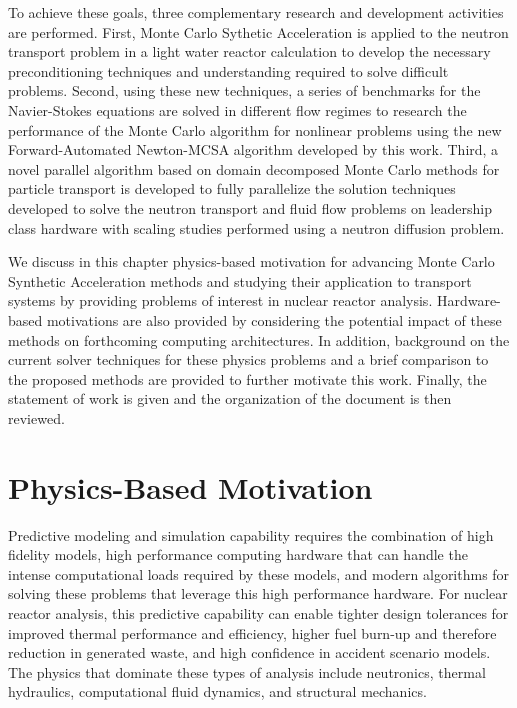 To achieve these goals, three complementary research and development
activities are performed. First, Monte Carlo Sythetic Acceleration is
applied to the neutron transport problem in a light water reactor
calculation to develop the necessary preconditioning techniques and
understanding required to solve difficult problems. Second, using
these new techniques, a series of benchmarks for the Navier-Stokes
equations are solved in different flow regimes to research the
performance of the Monte Carlo algorithm for nonlinear problems using
the new Forward-Automated Newton-MCSA algorithm developed by this
work. Third, a novel parallel algorithm based on domain decomposed
Monte Carlo methods for particle transport is developed to fully
parallelize the solution techniques developed to solve the neutron
transport and fluid flow problems on leadership class hardware with
scaling studies performed using a neutron diffusion problem.

We discuss in this chapter physics-based motivation for advancing
Monte Carlo Synthetic Acceleration methods and studying their
application to transport systems by providing problems of interest in
nuclear reactor analysis. Hardware-based motivations are also provided
by considering the potential impact of these methods on forthcoming
computing architectures. In addition, background on the current solver
techniques for these physics problems and a brief comparison to the
proposed methods are provided to further motivate this work. Finally,
the statement of work is given and the organization of the document is
then reviewed.

\section{Physics-Based Motivation}
\label{sec:physics_motivation}
Predictive modeling and simulation capability requires the combination
of high fidelity models, high performance computing hardware that can
handle the intense computational loads required by these models, and
modern algorithms for solving these problems that leverage this high
performance hardware. For nuclear reactor analysis, this predictive
capability can enable tighter design tolerances for improved thermal
performance and efficiency, higher fuel burn-up and therefore
reduction in generated waste, and high confidence in accident scenario
models. The physics that dominate these types of analysis include
neutronics, thermal hydraulics, computational fluid dynamics, and
structural mechanics.


